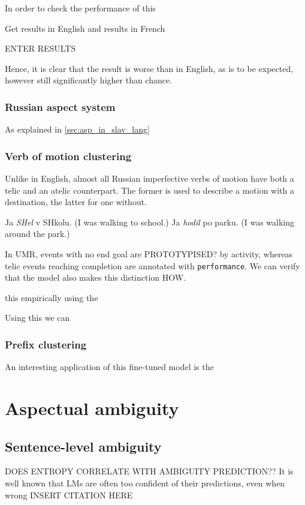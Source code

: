 In order to check the performance of this 

Get results in English and results in French

ENTER RESULTS

Hence, it is clear that the result is worse than in English, as is to be expected, however still significantly higher than chance.

\subsubsection{Russian aspect system}
As explained in \ref{sec:asp_in_slav_lang}
\subsubsection{Verb of motion clustering}
Unlike in English, almost all Russian imperfective verbs of motion have both a telic and an atelic counterpart. The former is used to describe a motion with a destination, the latter for one without.

\begin{exe}
    \ex Ja \emph{SHel} v SHkolu. (I was walking to school.)
    \ex Ja \emph{hodil} po parku. (I was walking around the park.)
\end{exe}

In UMR, events with no end goal are PROTOTYPISED? by activity, whereas telic events reaching completion are annotated with \texttt{performance}. We can verify that the model also makes this distinction HOW.

this empirically using the 

Using this we can 

\subsubsection{Prefix clustering}
An interesting application of this fine-tuned model is the 

\section{Aspectual ambiguity}
\subsection{Sentence-level ambiguity}
DOES ENTROPY CORRELATE WITH AMBIGUITY PREDICTION??
It is well known that LMs are often too confident of their predictions, even when wrong INSERT CITATION HERE

